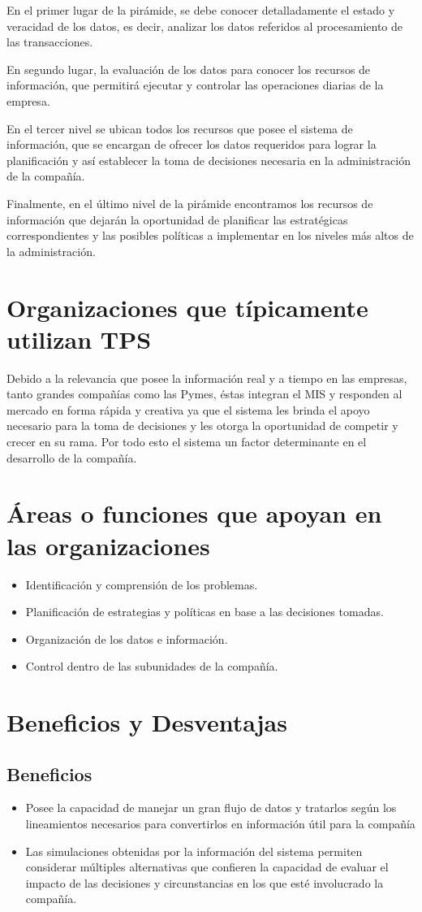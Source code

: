 En el  primer lugar de la pirámide, se debe conocer detalladamente el estado y veracidad de los datos, es decir, analizar los datos referidos al procesamiento de las transacciones.

En segundo lugar, la evaluación de los datos para conocer los recursos de información, que permitirá ejecutar y controlar las operaciones diarias de la empresa. 

En el tercer nivel se ubican todos los recursos que posee el sistema de información, que se encargan de ofrecer los datos requeridos para lograr la planificación y así establecer la toma de decisiones necesaria en la administración de la compañía. 

Finalmente, en el último nivel de la pirámide encontramos los recursos de información que dejarán la oportunidad de planificar las estratégicas correspondientes y las posibles políticas a implementar en los niveles más altos de la administración.

\section {Organizaciones que típicamente utilizan TPS}
Debido a la relevancia que posee la información real y a tiempo en las empresas, tanto grandes compañías como las Pymes, éstas integran el MIS y responden al mercado en forma rápida y creativa ya que el sistema les brinda el apoyo necesario para la toma de decisiones y les otorga la oportunidad de competir y crecer en su rama. Por todo esto el sistema un factor determinante en el desarrollo de la compañía.

\section {Áreas o funciones que apoyan en las organizaciones}
\begin{itemize}
\item Identificación y comprensión de los problemas.
\item Planificación de estrategias y políticas en base a las decisiones tomadas.
\item Organización de los datos e información.
\item Control dentro de las subunidades de la compañía.
\end{itemize}
\section {Beneficios y Desventajas}
\subsection{Beneficios}
\begin{itemize}
\item Posee la capacidad de manejar un gran flujo de datos y tratarlos según los lineamientos necesarios para convertirlos en información útil para la compañía
\item Las simulaciones obtenidas por la información del sistema permiten considerar múltiples alternativas que confieren la capacidad de evaluar el impacto de las decisiones y circunstancias en los que esté involucrado la compañía.
\end{itemize}
